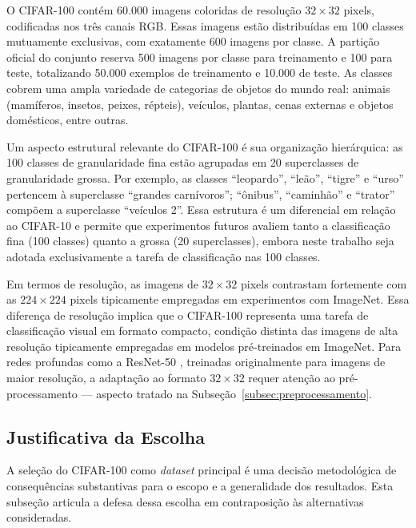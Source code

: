 O CIFAR-100 contém 60.000 imagens coloridas de resolução $32 \times 32$ pixels, codificadas nos três canais RGB. Essas imagens estão distribuídas em 100 classes mutuamente exclusivas, com exatamente 600 imagens por classe. A partição oficial do conjunto reserva 500 imagens por classe para treinamento e 100 para teste, totalizando 50.000 exemplos de treinamento e 10.000 de teste. As classes cobrem uma ampla variedade de categorias de objetos do mundo real: animais (mamíferos, insetos, peixes, répteis), veículos, plantas, cenas externas e objetos domésticos, entre outras.

Um aspecto estrutural relevante do CIFAR-100 é sua organização hierárquica: as 100 classes de granularidade fina estão agrupadas em 20 superclasses de granularidade grossa. Por exemplo, as classes ``leopardo'', ``leão'', ``tigre'' e ``urso'' pertencem à superclasse ``grandes carnívoros''; ``ônibus'', ``caminhão'' e ``trator'' compõem a superclasse ``veículos 2''. Essa estrutura é um diferencial em relação ao CIFAR-10 e permite que experimentos futuros avaliem tanto a classificação fina (100 classes) quanto a grossa (20 superclasses), embora neste trabalho seja adotada exclusivamente a tarefa de classificação nas 100 classes.

Em termos de resolução, as imagens de $32 \times 32$ pixels contrastam fortemente com as $224 \times 224$ pixels tipicamente empregadas em experimentos com ImageNet. Essa diferença de resolução implica que o CIFAR-100 representa uma tarefa de classificação visual em formato compacto, condição distinta das imagens de alta resolução tipicamente empregadas em modelos pré-treinados em ImageNet. Para redes profundas como a ResNet-50 \cite{He2016}, treinadas originalmente para imagens de maior resolução, a adaptação ao formato $32 \times 32$ requer atenção ao pré-processamento --- aspecto tratado na Subseção~\ref{subsec:preprocessamento}.

\subsection{Justificativa da Escolha}\label{subsec:dataset_justificativa}

A seleção do CIFAR-100 como \textit{dataset} principal é uma decisão metodológica de consequências substantivas para o escopo e a generalidade dos resultados. Esta subseção articula a defesa dessa escolha em contraposição às alternativas consideradas.


